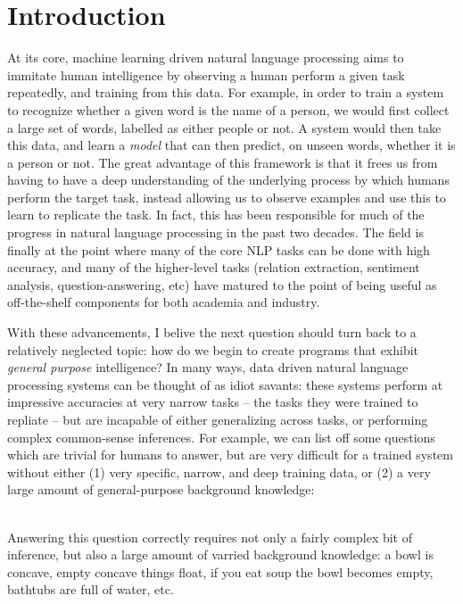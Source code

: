 \chapter{Introduction}

%
%
At its core, machine learning driven natural language processing aims to immitate human intelligence by
  observing a human perform a given task repeatedly, and training from this data.
For example, in order to train a system to recognize whether a given word is the name of a person,
  we would first collect a large set of words, labelled as either people or not.
A system would then take this data, and learn a \textit{model} that can then predict, on unseen
  words, whether it is a person or not.
The great advantage of this framework is that it frees us from having to have a deep understanding of
  the underlying process by which humans perform the target task, instead allowing us to observe
  examples and use this to learn to replicate the task.
In fact, this has been responsible for much of the progress in natural language processing in the
  past two decades.
The field is finally at the point where many of the core NLP tasks can be done with high accuracy,
  and many of the higher-level tasks (relation extraction, sentiment analysis, question-answering, etc)
  have matured to the point of being useful as off-the-shelf components for both academia and industry.

With these advancements, I belive the next question should turn back to a relatively neglected
  topic: how do we begin to create programs that exhibit \textit{general purpose} intelligence?
In many ways, data driven natural language processing systems can be thought of as idiot savants:
  these systems perform at impressive accuracies at very narrow tasks -- the tasks they were trained
  to repliate -- but are incapable of either generalizing across tasks, or performing complex
  common-sense inferences.
For example, we can list off some questions which are trivial for humans to answer, but are very difficult
  for a trained system without either (1) very specific, narrow, and deep training data, or (2) a very large
  amount of general-purpose background knowledge:

\begin{displayquote}
   \\
  Answering this question correctly requires not only a fairly complex bit of inference, but also
    a large amount of varried background knowledge: a bowl is concave, empty concave things float,
    if you eat soup the bowl becomes empty, bathtubs are full of water, etc.
\end{displayquote}

